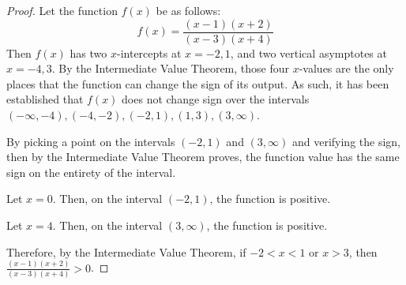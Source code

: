 \documentclass[10pt]{article}
\theoremstyle{definition}
\theoremstyle{plain}
\begin{document}
\begin{proof}
  Let the function $f(x)$ be as follows:
  \begin{equation*}
    f(x) = \frac{(x-1)(x+2)}{(x-3)(x+4)}
  \end{equation*}
  Then $f(x)$ has two $x$-intercepts at $x=-2,1$, and two vertical asymptotes at $x=-4,3$. By the Intermediate Value Theorem, those four $x$-values are the only places that the function can change the sign of its output. As such, it has been established that $f(x)$ does not change sign over the intervals $(-\infty,-4),(-4,-2),(-2,1),(1,3),(3,\infty)$. \\

  \par By picking a point on the intervals $(-2,1)$ and $(3,\infty)$ and verifying the sign, then by the Intermediate Value Theorem proves, the function value has the same sign on the entirety of the interval. \\

  \par Let $x=0$. Then, on the interval $(-2,1)$, the function is positive. \\

  \par Let $x=4$. Then, on the interval $(3,\infty)$, the function is positive. \\

  \par Therefore, by the Intermediate Value Theorem, if $-2 < x < 1$ or $x > 3$, then $\frac{(x-1)(x+2)}{(x-3)(x+4)} > 0$.
\end{proof}
\end{document}
